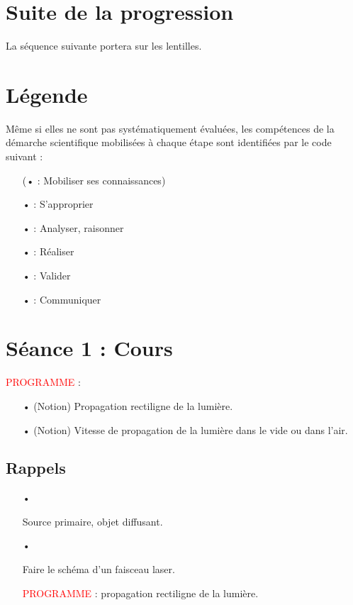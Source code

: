 \documentclass[12pt,a4paper,fleqn]{article}
\newcommand{\prog}{\textcolor{red}{PROGRAMME}}
\begin{document}
\section*{Suite de la progression}

La séquence suivante portera sur les lentilles.

\section*{Légende}

Même si elles ne sont pas systématiquement évaluées, les compétences de la démarche scientifique mobilisées à chaque étape sont identifiées par le code suivant :
\begin{itemize}
\item[(•] \rco{} : Mobiliser ses connaissances)
\item[•] \app{} : S'approprier
\item[•] \anarai{} : Analyser, raisonner
\item[•] \rea{} : Réaliser
\item[•] \val{} : Valider
\item[•] \com{} : Communiquer
\end{itemize} 





\newpage
\section*{Séance 1 : Cours}

\noindent
\prog{} :
\begin{itemize}
\item[•] (Notion) Propagation rectiligne de la lumière.
\item[•] (Notion) Vitesse de propagation de la lumière dans le vide ou dans l'air.
\end{itemize}

\subsection*{Rappels}

\begin{itemize}
\item[•] \anarai

Source primaire, objet diffusant.

\item[•] \rea{}

Faire le schéma d'un faisceau laser.

\prog{} : propagation rectiligne de la lumière.
\end{itemize}
\end{document}
